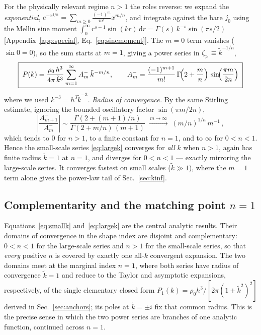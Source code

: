 \documentclass[aps,prd,onecolumn]{revtex4-2}
\newcommand{\kt}{\tilde{k}}          %
\begin{document}
For the physically relevant regime $n>1$ the roles reverse: we expand the
\emph{exponential}, $e^{-x^{1/n}}=\sum_{m\ge0}\frac{(-1)^m}{m!}x^{m/n}$,
and integrate against the bare $j_0$ using the Mellin sine moment
$\int_0^\infty r^{s-1}\sin(kr)\,\mathrm{d}r=\Gamma(s)\,k^{-s}\sin(\pi s/2)$
[Appendix~\ref{app:special}, Eq.~\eqref{eq:sinemoment}].  The $m=0$ term
vanishes ($\sin0=0$), so the sum starts at $m=1$, giving a power series in
$\zeta_>\equiv\kt^{-1/n}$,
\begin{equation}
\boxed{\;
P(k)=\frac{\rho_0\,h^3}{4\pi\,\kt^{3}}
\sum_{m=1}^{\infty} A_m^{-}\,\kt^{-m/n},
\qquad
A_m^{-}=\frac{(-1)^{m+1}}{m!}\,
\Gamma\!\Bigl(2+\frac{m}{n}\Bigr)\,
\sin\!\Bigl(\frac{\pi m}{2n}\Bigr)\;}
\label{eq:largek}
\end{equation}
where we used $k^{-3}=h^{3}\kt^{-3}$.  \emph{Radius of convergence.}  By
the same Stirling estimate, ignoring the bounded oscillatory factor
$\sin(\pi m/2n)$,
\begin{equation}
\left|\frac{A_{m+1}^{-}}{A_{m}^{-}}\right|
\sim\frac{\Gamma(2+(m+1)/n)}{\Gamma(2+m/n)\,(m+1)}
\;\xrightarrow{\,m\to\infty\,}\;
(m/n)^{1/n}\,m^{-1}\,,
\end{equation}
which tends to $0$ for $n>1$, to a finite constant for $n=1$, and to
$\infty$ for $0<n<1$.  Hence the small-scale series \eqref{eq:largek}
converges for \emph{all} $k$ when $n>1$, again has finite radius
$\kt=1$ at $n=1$, and diverges for $0<n<1$ --- exactly mirroring the
large-scale series.  It converges fastest on small scales ($\kt\gg1$),
where the $m=1$ term alone gives the power-law tail of Sec.~\ref{sec:kinf}.

\subsection{Complementarity and the matching point $n=1$}
\label{sec:matching}

Equations~\eqref{eq:smallk} and~\eqref{eq:largek} are the central analytic
results.  Their domains of convergence in the shape index are disjoint and
complementary: $0<n<1$ for the large-scale series and $n>1$ for the
small-scale series, so that \emph{every} positive $n$ is covered by
exactly one all-$k$ convergent expansion.  The two domains meet at the
marginal index $n=1$, where both series have radius of convergence $\kt=1$
and reduce to the Taylor and asymptotic expansions, respectively, of the
single elementary closed form
$P_1(k)=\rho_0 h^3/[2\pi(1+\kt^2)^2]$ derived in
Sec.~\ref{sec:anchors}; its poles at $\kt=\pm i$ fix that common radius.
This is the precise sense in which the two power series are branches of
one analytic function, continued across $n=1$.
\end{document}
